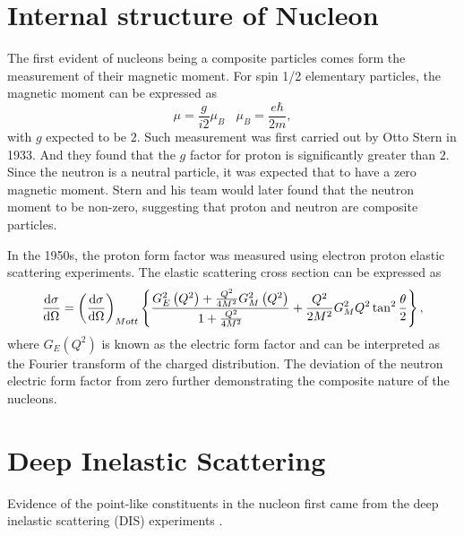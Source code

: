 \section {Internal structure of Nucleon}
The first evident of nucleons being a composite particles comes form the 
measurement of their magnetic moment. For spin 1/2 elementary particles, the 
magnetic moment can be expressed as 
\begin{equation}
\mu = \frac{g}{i2}\mu_B ~~~~ \mu_B = \frac{e\hbar}{2m},
\end{equation}
with $g$ expected to be $2$. Such measurement was first carried out by Otto 
Stern in 1933. And they found that the $g$ factor for proton is significantly 
greater than $2$. Since the neutron is a neutral particle, it was expected that
to have a zero magnetic moment. Stern and his team would later found that the 
neutron moment to be non-zero, suggesting that proton and neutron are composite
particles.

In the 1950s, the proton form factor was measured using electron proton elastic
scattering experiments\cite{hofstadter1956}. The elastic scattering cross 
section can be expressed as 
\begin{equation}
\dv{\sigma}{\Omega} = \left(\dv{\sigma}{\Omega}\right)_{Mott}\left\{ 
	\frac{G_E^2\left(Q^2\right) + \frac{Q^2}{4M^2}G_M^2 \left(Q^2\right)}
	{1 + \frac{Q^2}{4M^2}} + \frac{Q^2}{2M^2} G^2_M{Q^2}\tan^2\frac{\theta}{2}
	\right\},
\end{equation}
where $G_E\left(Q^2\right)$ is known as the electric form factor and can be 
interpreted as the Fourier transform of the charged distribution. The deviation
of the neutron electric form factor from zero further demonstrating the 
composite nature of the nucleons.

\section {Deep Inelastic Scattering}
\label{sec:dis}
Evidence of the point-like constituents in the nucleon first came from the deep
inelastic scattering (DIS) experiments \cite{breidenbach1969}. 


